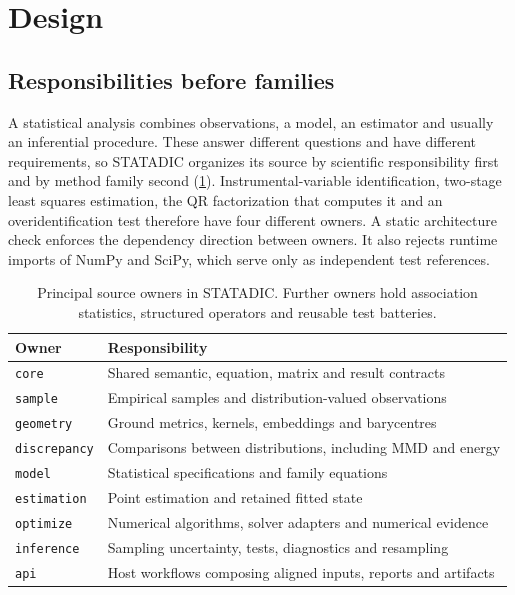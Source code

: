 \section{Design}\label{sec:design}

\subsection{Responsibilities before families}

A statistical analysis combines observations, a model, an estimator and usually
an inferential procedure. These answer different questions and have different
requirements, so STATADIC organizes its source by scientific responsibility first
and by method family second (\cref{tab:modules}). Instrumental-variable
identification, two-stage least squares estimation, the QR factorization that
computes it and an overidentification test therefore have four different
owners. A static architecture check enforces the dependency direction between
owners. It also rejects runtime imports of NumPy and SciPy, which serve only as
independent test references.

\begin{table}[t]
  \centering
  \small
  \caption{Principal source owners in STATADIC. Further owners hold association
  statistics, structured operators and reusable test batteries.}
  \label{tab:modules}
  \begin{tabular}{@{}ll@{}}
    \toprule
    Owner & Responsibility \\
    \midrule
    \texttt{core} & Shared semantic, equation, matrix and result contracts \\
    \texttt{sample} & Empirical samples and distribution-valued observations \\
    \texttt{geometry} & Ground metrics, kernels, embeddings and barycentres \\
    \texttt{discrepancy} & Comparisons between distributions, including MMD
    and energy \\
    \texttt{model} & Statistical specifications and family equations \\
    \texttt{estimation} & Point estimation and retained fitted state \\
    \texttt{optimize} & Numerical algorithms, solver adapters and numerical evidence \\
    \texttt{inference} & Sampling uncertainty, tests, diagnostics and resampling \\
    \texttt{api} & Host workflows composing aligned inputs, reports and artifacts \\
    \bottomrule
  \end{tabular}
\end{table}

